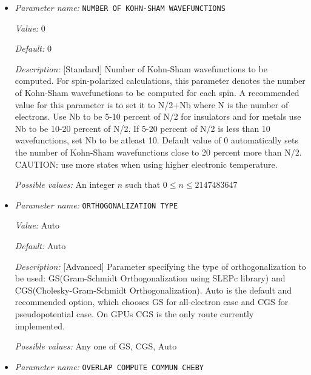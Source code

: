 \begin{itemize}
{\it Possible values:} An integer $n$ such that $0\leq n \leq 2147483647$
\item {\it Parameter name:} {\tt NUMBER OF KOHN-SHAM WAVEFUNCTIONS}
\label{parameters:SCF parameters/Eigen_2dsolver parameters/NUMBER OF KOHN_2dSHAM WAVEFUNCTIONS}
\label{parameters:SCF_20parameters/Eigen_2dsolver_20parameters/NUMBER_20OF_20KOHN_2dSHAM_20WAVEFUNCTIONS}


{\it Value:} 0


{\it Default:} 0


{\it Description:} [Standard] Number of Kohn-Sham wavefunctions to be computed. For spin-polarized calculations, this parameter denotes the number of Kohn-Sham wavefunctions to be computed for each spin. A recommended value for this parameter is to set it to N/2+Nb where N is the number of electrons. Use Nb to be 5-10 percent of N/2 for insulators and for metals use Nb to be 10-20 percent of N/2. If 5-20 percent of N/2 is less than 10 wavefunctions, set Nb to be atleast 10. Default value of 0 automatically sets the number of Kohn-Sham wavefunctions close to 20 percent more than N/2. CAUTION: use more states when using higher electronic temperature.


{\it Possible values:} An integer $n$ such that $0\leq n \leq 2147483647$
\item {\it Parameter name:} {\tt ORTHOGONALIZATION TYPE}
\label{parameters:SCF parameters/Eigen_2dsolver parameters/ORTHOGONALIZATION TYPE}
\label{parameters:SCF_20parameters/Eigen_2dsolver_20parameters/ORTHOGONALIZATION_20TYPE}


{\it Value:} Auto


{\it Default:} Auto


{\it Description:} [Advanced] Parameter specifying the type of orthogonalization to be used: GS(Gram-Schmidt Orthogonalization using SLEPc library) and CGS(Cholesky-Gram-Schmidt Orthogonalization). Auto is the default and recommended option, which chooses GS for all-electron case and CGS for pseudopotential case. On GPUs CGS is the only route currently implemented.


{\it Possible values:} Any one of GS, CGS, Auto
\item {\it Parameter name:} {\tt OVERLAP COMPUTE COMMUN CHEBY}
\label{parameters:SCF parameters/Eigen_2dsolver parameters/OVERLAP COMPUTE COMMUN CHEBY}
\label{parameters:SCF_20parameters/Eigen_2dsolver_20parameters/OVERLAP_20COMPUTE_20COMMUN_20CHEBY}



\end{itemize}
